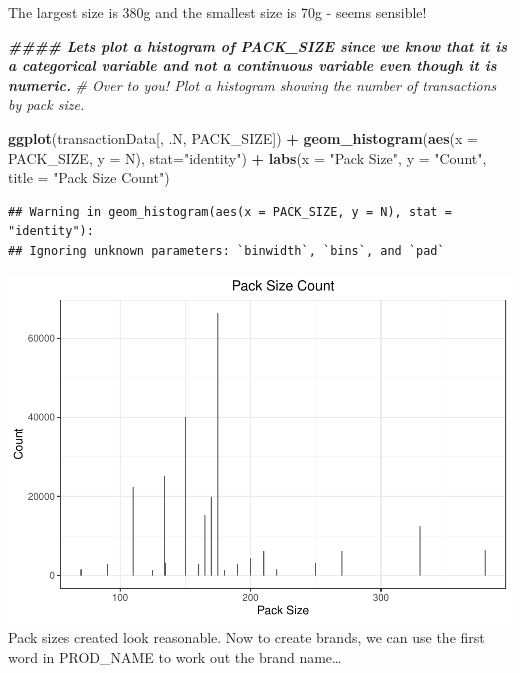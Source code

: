 \documentclass[
]{article}
\newenvironment{Shaded}{\begin{snugshade}}{\end{snugshade}}
\newcommand{\AttributeTok}[1]{\textcolor[rgb]{0.13,0.29,0.53}{#1}}
\newcommand{\CommentTok}[1]{\textcolor[rgb]{0.56,0.35,0.01}{\textit{#1}}}
\newcommand{\DocumentationTok}[1]{\textcolor[rgb]{0.56,0.35,0.01}{\textbf{\textit{#1}}}}
\newcommand{\FunctionTok}[1]{\textcolor[rgb]{0.13,0.29,0.53}{\textbf{#1}}}
\newcommand{\NormalTok}[1]{#1}
\newcommand{\SpecialCharTok}[1]{\textcolor[rgb]{0.81,0.36,0.00}{\textbf{#1}}}
\newcommand{\StringTok}[1]{\textcolor[rgb]{0.31,0.60,0.02}{#1}}
\begin{document}
The largest size is 380g and the smallest size is 70g - seems sensible!

\begin{Shaded}
\begin{Highlighting}[]
\DocumentationTok{\#\#\#\# Let\textquotesingle{}s plot a histogram of PACK\_SIZE since we know that it is a categorical variable and not a continuous variable even though it is numeric.}
\CommentTok{\# Over to you! Plot a histogram showing the number of transactions by pack size.}

\FunctionTok{ggplot}\NormalTok{(transactionData[, .N, PACK\_SIZE]) }\SpecialCharTok{+} \FunctionTok{geom\_histogram}\NormalTok{(}\FunctionTok{aes}\NormalTok{(}\AttributeTok{x =}\NormalTok{ PACK\_SIZE, }\AttributeTok{y =}\NormalTok{ N), }\AttributeTok{stat=}\StringTok{"identity"}\NormalTok{) }\SpecialCharTok{+} \FunctionTok{labs}\NormalTok{(}\AttributeTok{x =} \StringTok{"Pack Size"}\NormalTok{, }\AttributeTok{y =} \StringTok{"Count"}\NormalTok{, }\AttributeTok{title =} \StringTok{"Pack Size Count"}\NormalTok{)}
\end{Highlighting}
\end{Shaded}

\begin{verbatim}
## Warning in geom_histogram(aes(x = PACK_SIZE, y = N), stat = "identity"):
## Ignoring unknown parameters: `binwidth`, `bins`, and `pad`
\end{verbatim}

\includegraphics{template_files/figure-latex/unnamed-chunk-9-1.pdf} Pack
sizes created look reasonable. Now to create brands, we can use the
first word in PROD\_NAME to work out the brand name\ldots{}
\end{document}
